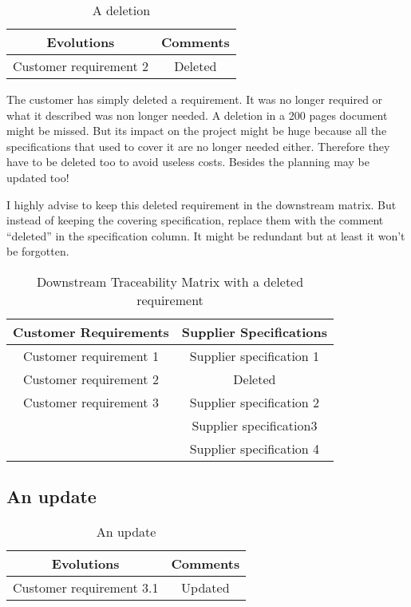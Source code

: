 \begin{table*}
	\centering
		\begin{tabular}{|c|c|}
			\hline
			Evolutions & Comments\\
            \hline
            Customer requirement 2 & Deleted\\
            \hline
		\end{tabular}
	\caption{A deletion}
	\label{tab:Deletion}
\end{table*}

The customer has simply deleted a requirement. It was no longer required or what it described was non longer needed. A deletion in a 200 pages document might be missed. But its impact on the project might be huge because all the specifications that used to cover it are no longer needed either. Therefore they have to be deleted too to avoid useless costs. Besides the planning may be updated too!

I highly advise to keep this deleted requirement in the downstream matrix. But instead of keeping the covering specification, replace them with the comment “deleted” in the specification column. It might be redundant but at least it won’t be forgotten.

\begin{table*}
	\centering
		\begin{tabular}{|c|c|}
			\hline
			Customer Requirements & Supplier Specifications\\
            \hline
            Customer requirement 1 & Supplier specification 1\\
            \hline
            Customer requirement 2 & Deleted\\
            \hline
            Customer requirement 3 & Supplier specification 2\\
            &Supplier specification3\\
            &Supplier specification 4\\
            \hline
		\end{tabular}
	\caption{Downstream Traceability Matrix with a deleted requirement}
	\label{tab:DownstreamTraceabilityMatrixWithDeletedReq}
\end{table*}

\subsection{An update}

\begin{table*}
	\centering
		\begin{tabular}{|c|c|}
			\hline
			\textbf{Evolutions} & \textbf{Comments}\\
            \hline
            Customer requirement 3.1 & Updated\\
            \hline
		\end{tabular}
	\caption{An update}
	\label{tab:Update}
\end{table*}

